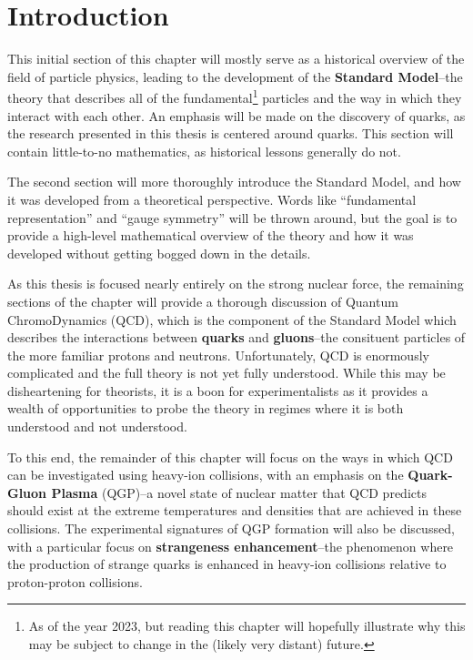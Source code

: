 \chapter{Introduction}

This initial section of this chapter will mostly serve as a historical overview of the field of particle physics, leading to the development of the \textbf{Standard Model}--the theory that describes all of the fundamental\footnote{As of the year 2023, but reading this chapter will hopefully illustrate why this may be subject to change in the (likely very distant) future.} particles and the way in which they interact with each other. An emphasis will be made on the discovery of quarks, as the research presented in this thesis is centered around quarks. This section will contain little-to-no mathematics, as historical lessons generally do not. 

The second section will more thoroughly introduce the Standard Model, and how it was developed from a theoretical perspective. Words like ``fundamental representation'' and ``gauge symmetry'' will be thrown around, but the goal is to provide a high-level mathematical overview of the theory and how it was developed without getting bogged down in the details.

As this thesis is focused nearly entirely on the strong nuclear force, the remaining sections of the chapter will provide a thorough discussion of Quantum ChromoDynamics (QCD), which is the component of the Standard Model which describes the interactions between \textbf{quarks} and \textbf{gluons}--the consituent particles of the more familiar protons and neutrons. Unfortunately, QCD is enormously complicated and the full theory is not yet fully understood. While this may be disheartening for theorists, it is a boon for experimentalists as it provides a wealth of opportunities to probe the theory in regimes where it is both understood and not understood. 

To this end, the remainder of this chapter will focus on the ways in which QCD can be investigated using heavy-ion collisions, with an emphasis on the \textbf{Quark-Gluon Plasma} (QGP)--a novel state of nuclear matter that QCD predicts should exist at the extreme temperatures and densities that are achieved in these collisions. The experimental signatures of QGP formation will also be discussed, with a particular focus on \textbf{strangeness enhancement}--the phenomenon where the production of strange quarks is enhanced in heavy-ion collisions relative to proton-proton collisions. 

